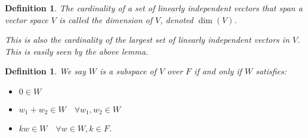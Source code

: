 \documentclass{article}
\theoremstyle{norm}
\newtheorem{df}[thm]{Definition}
\begin{document}
\begin{df}
The cardinality of a set of linearly independent vectors that span a
vector space $V$ is called the dimension of $V$, denoted $\dim(V)$.

This is also the cardinality of the largest set of linearly independent
vectors in $V$. This is easily seen by the above lemma.
\end{df}

\begin{df}
We say $W$ is a subspace of $V$ over $F$ if and only if $W$ satisfies:
\begin{itemize}
\item $0 \in W$
\item $w_1 + w_2 \in W \quad \forall w_1, w_2 \in W$
\item $k w \in W \quad \forall w \in W, k \in F$.
\end{itemize}
\end{df}
\end{document}
